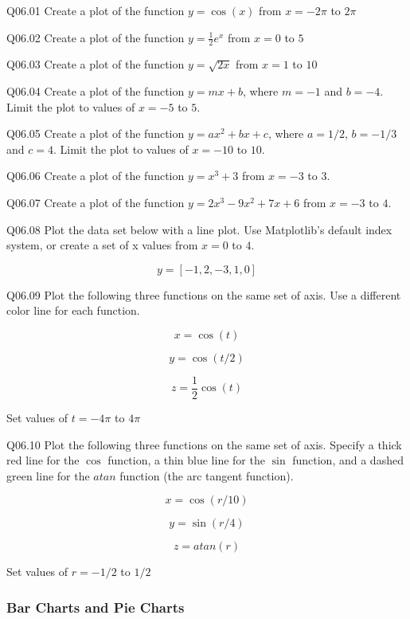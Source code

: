 \documentclass{book}
\newenvironment{problems}{}{}  %
\begin{document}
    
        \begin{problems}
        Q06.01 Create a plot of the function \(y=\cos(x)\) from \(x = -2\pi\) to
\(2\pi\)

Q06.02 Create a plot of the function \(y=\frac{1}{2}{e^x}\) from
\(x = 0\) to \(5\)

Q06.03 Create a plot of the function \(y=\sqrt{2x}\) from \(x = 1\) to
\(10\)

Q06.04 Create a plot of the function \(y=mx+b\), where \(m=-1\) and
\(b=-4\). Limit the plot to values of \(x=-5\) to \(5\).

Q06.05 Create a plot of the function \(y=ax^2+bx+c\), where \(a=1/2\),
\(b=-1/3\) and \(c=4\). Limit the plot to values of \(x=-10\) to \(10\).

Q06.06 Create a plot of the function \(y=x^3+3\) from \(x=-3\) to \(3\).

Q06.07 Create a plot of the function \(y=2x^3-9x^2+7x+6\) from \(x=-3\)
to \(4\).

Q06.08 Plot the data set below with a line plot. Use Matplotlib's
default index system, or create a set of x values from \(x=0\) to \(4\).

\[ y = [-1, 2, -3, 1, 0] \]

Q06.09 Plot the following three functions on the same set of axis. Use a
different color line for each function.

\[ x = \cos(t) \]

\[ y = \cos(t/2) \]

\[ z = \frac{1}{2}\cos(t) \]

Set values of \(t=-4\pi\) to \(4\pi\)

Q06.10 Plot the following three functions on the same set of axis.
Specify a thick red line for the \(\cos\) function, a thin blue line for
the \(\sin\) function, and a dashed green line for the \(atan\) function
(the arc tangent function).

\[ x = \cos(r/10) \]

\[ y = \sin(r/4) \]

\[ z = atan(r) \]

Set values of \(r=-1/2\) to \(1/2\)
        \end{problems}

    




    
        \hypertarget{bar-charts-and-pie-charts}{%
\subsubsection{Bar Charts and Pie
Charts}\label{bar-charts-and-pie-charts}}
    
\end{document}
